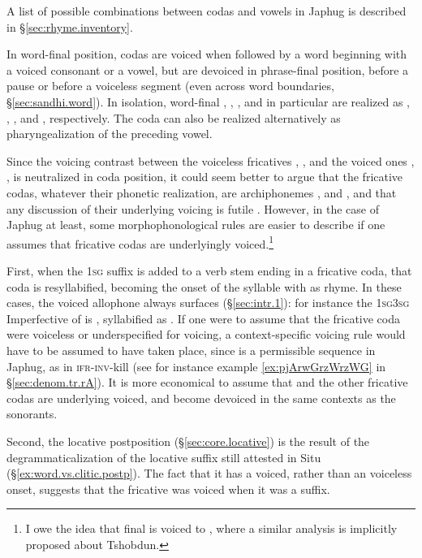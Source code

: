 A list of possible combinations between codas and vowels in Japhug is described in §\ref{sec:rhyme.inventory}.

In word-final position, codas are voiced when followed by a word beginning with a voiced consonant or a vowel, but are devoiced in phrase-final position, before a pause or before a voiceless segment (even across word boundaries, §\ref{sec:sandhi.word}). In isolation, word-final , , ,  and  in particular are realized as , , ,  and , respectively. The coda  can also be realized alternatively as pharyngealization of the preceding vowel.  

Since the voicing contrast between the voiceless fricatives , ,  and  the voiced ones , ,  is neutralized in coda position, it could seem better to argue that the fricative codas, whatever their phonetic realization, are archiphonemes ,  and , and that any discussion of their underlying voicing is futile \citep{hill16refutation}. However, in the case of Japhug at least, some morphophonological rules are easier to describe if one assumes that fricative codas are underlyingly voiced.\footnote{I owe the idea that final  is voiced to \citet{jackson05yingao}, where a similar analysis is implicitly proposed about Tshobdun. } 

First, when the \textsc{1sg}  suffix is added to a verb stem ending in a fricative coda, that coda is resyllabified, becoming the onset of the syllable with  as rhyme. In these cases, the voiced allophone always surfaces (§\ref{sec:intr.1}): for instance the \textsc{1sg\fl{}3sg} Imperfective of  is , syllabified as . If one were to assume that the fricative coda  were voiceless or underspecified for voicing, a context-specific voicing rule would have to be assumed to have taken place, since  is a permissible sequence in Japhug, as in  \textsc{ifr}-\textsc{inv}-kill (see for instance example \ref{ex:pjArwGrzWrzWG} in §\ref{sec:denom.tr.rA}). It is more economical to assume that  and the other fricative codas are underlying voiced, and become  devoiced in the same contexts as the sonorants.

Second, the locative postposition  (§\ref{sec:core.locative}) is the result of the degrammaticalization of the locative  suffix still attested in Situ (§\ref{ex:word.vs.clitic.postp}). The fact that it has a voiced, rather than an voiceless onset, suggests that the fricative was voiced when it was a suffix.


